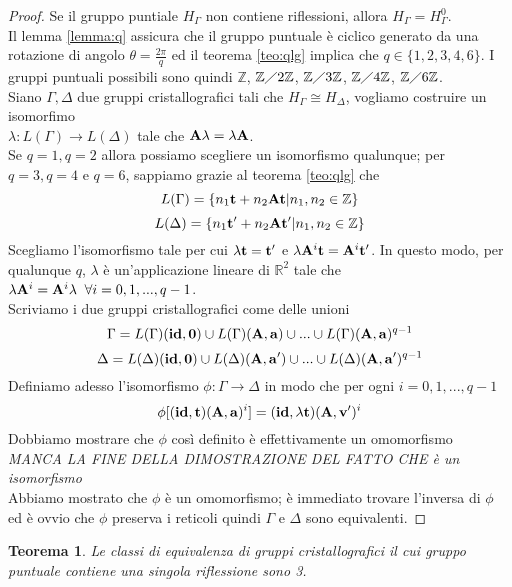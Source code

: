 \documentclass[a4paper,11pt,openright,twoside	]{book}
\newtheorem{theorem}{Teorema}[section]
\begin{document}
\begin{proof}
Se il gruppo puntiale $H_{\Gamma}$ non contiene riflessioni, allora $H_{\Gamma} = H_{\Gamma}^0$.\\
Il lemma \ref{lemma:q} assicura che il gruppo puntuale è ciclico generato da una rotazione di angolo $\theta = \frac{2 \pi}{q}$ ed il teorema \ref{teo:qlg} implica che $q \in \{ 1, 2, 3, 4, 6\}$. I gruppi puntuali possibili sono quindi $\mathbb{Z}$, $\mathbb{Z} \diagup 2 \mathbb{Z}$, $\mathbb{Z} \diagup 3 \mathbb{Z}$, $\mathbb{Z} \diagup 4 \mathbb{Z}$, $\mathbb{Z} \diagup 6 \mathbb{Z}$. \\
Siano $\Gamma, \Delta$ due gruppi cristallografici tali che $H_{\Gamma} \cong H_{\Delta}$, vogliamo costruire un isomorfimo \\
$\lambda: L(\Gamma) \longrightarrow L(\Delta)$ tale che $\vb{A} \lambda = \lambda \vb{A}$. \\
Se $q = 1, q=2$ allora possiamo scegliere un isomorfismo qualunque; per $q=3, q=4$ e $q=6$, sappiamo grazie al teorema \ref{teo:qlg} che 
\[ L(\Gamma) = \{ n_1 \vb{t} + n_2 \vb{A} \vb{t} | n_1, n_2 \in \mathbb{Z} \}\]
\[L(\Delta) = \{ n_1 \vb{t'} + n_2 \vb{A} \vb{t'} | n_1, n_2 \in \mathbb{Z} \} \]
Scegliamo l'isomorfismo tale per cui $\lambda \vb{t} = \vb{t'}$  e $\lambda \vb{A}^i \vb{t} = \vb{A}^i \vb{t'}$. 
In questo modo, per qualunque $q$, $\lambda$ è un'applicazione lineare di $\mathbb{R}^2$ tale che $\lambda \vb{A}^i =  \vb{A}^i \lambda \; \; \forall i = 0, 1,...,q-1$. \\
Scriviamo i due gruppi cristallografici come delle unioni
\[ \Gamma = L(\Gamma)(\vb{id, 0}) \cup L(\Gamma)(\vb{A, a}) \cup ... \cup L(\Gamma)(\vb{A, a})^{q-1} \]
\[ \Delta = L(\Delta)(\vb{id, 0}) \cup L(\Delta)(\vb{A, a'}) \cup ... \cup L(\Delta)(\vb{A, a'})^{q-1} \]
Definiamo adesso l'isomorfismo $\phi : \Gamma \longrightarrow \Delta$ in modo che per ogni $i = 0, 1,...,q-1$
\[ \phi[(\vb{id, t})(\vb{A, a})^i] = (\vb{id}, \lambda\vb{t})(\vb{A, v'})^i \]
Dobbiamo mostrare che $\phi$ così definito è effettivamente un omomorfismo \\
\emph{MANCA LA FINE DELLA DIMOSTRAZIONE DEL FATTO CHE è un isomorfismo} \\
Abbiamo mostrato che $\phi$ è un omomorfismo; è immediato trovare l'inversa di $\phi$ ed è ovvio che $\phi$ preserva i reticoli quindi $\Gamma$ e $\Delta$ sono equivalenti.  
\end{proof}

\begin{theorem}
Le classi di equivalenza di gruppi cristallografici il cui gruppo puntuale contiene una singola riflessione sono 3.
\end{theorem}
\end{document}
